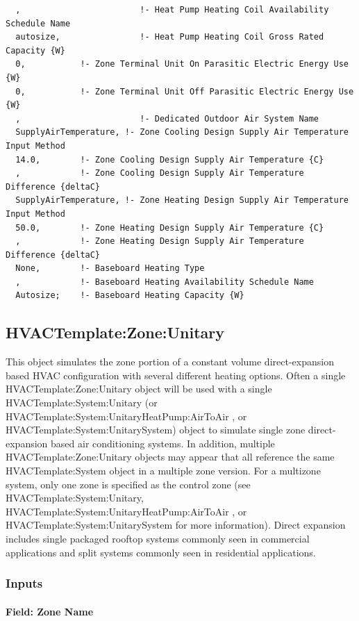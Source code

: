 \begin{lstlisting}
  ,                        !- Heat Pump Heating Coil Availability Schedule Name
  autosize,                !- Heat Pump Heating Coil Gross Rated Capacity {W}
  0,           !- Zone Terminal Unit On Parasitic Electric Energy Use {W}
  0,           !- Zone Terminal Unit Off Parasitic Electric Energy Use {W}
  ,                        !- Dedicated Outdoor Air System Name
  SupplyAirTemperature, !- Zone Cooling Design Supply Air Temperature Input Method
  14.0,        !- Zone Cooling Design Supply Air Temperature {C}
  ,            !- Zone Cooling Design Supply Air Temperature Difference {deltaC}
  SupplyAirTemperature, !- Zone Heating Design Supply Air Temperature Input Method
  50.0,        !- Zone Heating Design Supply Air Temperature {C}
  ,            !- Zone Heating Design Supply Air Temperature Difference {deltaC}
  None,        !- Baseboard Heating Type
  ,            !- Baseboard Heating Availability Schedule Name
  Autosize;    !- Baseboard Heating Capacity {W}
\end{lstlisting}

\subsection{HVACTemplate:Zone:Unitary}\label{hvactemplatezoneunitary}

This object simulates the zone portion of a constant volume direct-expansion based HVAC configuration with several different heating options. Often a single HVACTemplate:Zone:Unitary object will be used with a single HVACTemplate:System:Unitary (or HVACTemplate:System:UnitaryHeatPump:AirToAir , or HVACTemplate:System:UnitarySystem) object to simulate single zone direct-expansion based air conditioning systems. In addition, multiple HVACTemplate:Zone:Unitary objects may appear that all reference the same HVACTemplate:System object in a multiple zone version. For a multizone system, only one zone is specified as the control zone (see HVACTemplate:System:Unitary, HVACTemplate:System:UnitaryHeatPump:AirToAir , or HVACTemplate:System:UnitarySystem for more information). Direct expansion includes single packaged rooftop systems commonly seen in commercial applications and split systems commonly seen in residential applications.

\subsubsection{Inputs}\label{inputs-8-009}

\paragraph{Field: Zone Name}\label{field-zone-name-7-001}

